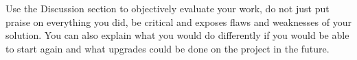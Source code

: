 \documentclass[fleqn,moreauthors,10pt]{ds_report}
\begin{document}
Use the Discussion section to objectively evaluate your work, do not just put praise on everything you did, be critical and exposes flaws and weaknesses of your solution. You can also explain what you would do differently if you would be able to start again and what upgrades could be done on the project in the future.







\end{document}
